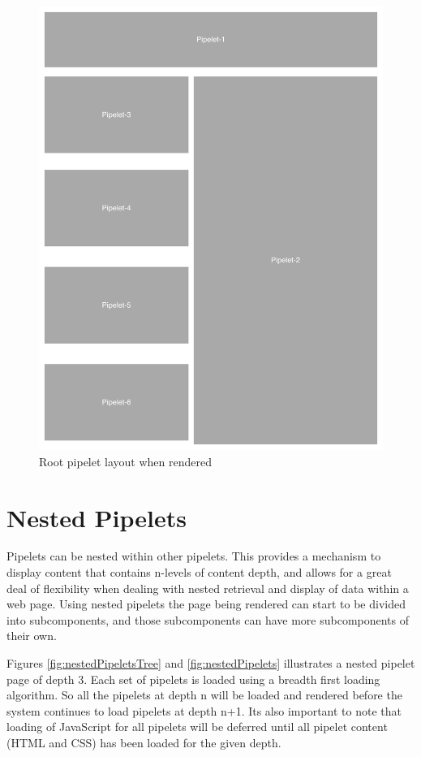 \documentclass[12pt]{report}
\begin{document}
 
\begin{figure}[H]
\centering
\includegraphics[width=\textwidth,keepaspectratio]{figures/images/root_pipelet.pdf}
\caption{Root pipelet layout when rendered}
\label{fig:rootPipeletLayout}
\end{figure}

	
\section{Nested Pipelets}
Pipelets can be nested within other pipelets. This provides a mechanism to display content that contains n-levels of content depth, and allows for a great deal of flexibility when dealing with nested retrieval and display of data within a web page. Using nested pipelets the page being rendered can start to be divided into subcomponents, and those subcomponents can have more subcomponents of their own. 

Figures \ref{fig:nestedPipeletsTree} and \ref{fig:nestedPipelets} illustrates a nested pipelet page of depth 3. Each set of pipelets is loaded using a breadth first loading algorithm. So all the pipelets at depth n will be loaded and rendered before the system continues to load pipelets at depth n+1. Its also important to note that loading of JavaScript for all pipelets will be deferred until all pipelet content (HTML and CSS) has been loaded for the given depth.
\end{document}
